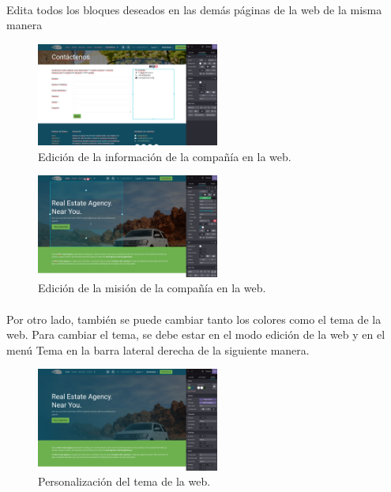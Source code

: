 \documentclass[paper=a4wide, fontsize=11pt]{report}	 %
\begin{document}
\paragraph{}
Edita todos los bloques deseados en las demás páginas de la web de la misma manera
\begin{figure}[h]
    \centering
    \includegraphics[width=6cm]{añadirInfoCompañia2.png}
    \caption{Edición de la información de la compañía en la web.}
    \label{fig:faqs}
\end{figure}
\begin{figure}[h]
    \centering
    \includegraphics[width=6cm]{añadirInfoCompañia3.png}
    \caption{Edición de la misión de la compañía en la web.}
    \label{fig:faqs}
\end{figure}
\paragraph{}
Por otro lado, también se puede cambiar tanto los colores como el tema de la web.
Para cambiar el tema, se debe estar en el modo edición de la web y en el menú Tema en la barra lateral derecha de la siguiente manera.
\newpage
\begin{figure}[h]
    \centering
    \includegraphics[width=6cm]{editTema.png}
    \caption{Personalización del tema de la web.}
    \label{fig:faqs}
\end{figure}
\end{document}
